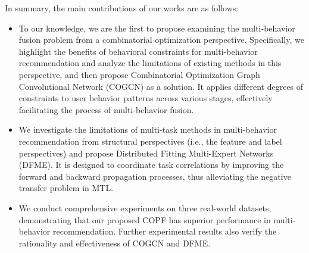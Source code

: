 In summary, the main contributions of our works are as follows:
\begin{itemize}
    \item To our knowledge, we are the first to propose examining the multi-behavior fusion problem from a combinatorial optimization perspective. Specifically, we highlight the benefits of behavioral constraints for multi-behavior recommendation and analyze the limitations of existing methods in this perspective, and then propose Combinatorial Optimization Graph Convolutional Network (COGCN) as a solution. It applies different degrees of constraints to user behavior patterns across various stages, effectively facilitating the process of multi-behavior fusion.
    \item We investigate the limitations of multi-task methods in multi-behavior recommendation from structural perspectives (i.e., the feature and label perspectives) and propose Distributed Fitting Multi-Expert Networks (DFME). It is designed to coordinate task correlations by improving the forward and backward propagation processes, thus alleviating the negative transfer problem in MTL.
    \item We conduct comprehensive experiments on three real-world datasets, demonstrating that our proposed COPF has superior performance in multi-behavior recommendation. Further experimental results also verify the rationality and effectiveness of COGCN and DFME.
\end{itemize}





